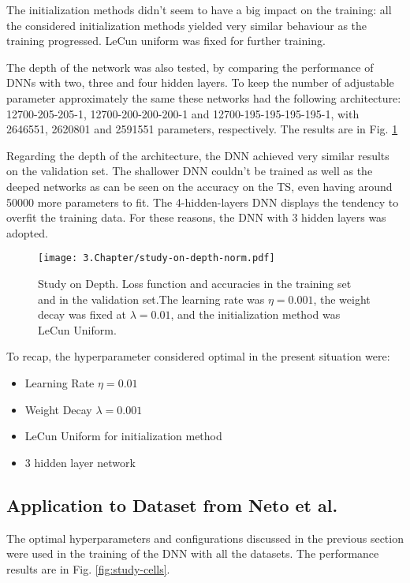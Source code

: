 The initialization methods didn't seem to have a big impact on the training: all the considered initialization methods yielded very similar behaviour as the training progressed. LeCun uniform was fixed for further training.


The depth of the network was also tested, by comparing the performance of DNNs with two, three and four hidden layers. To keep the number of adjustable parameter approximately the same these networks had the following architecture:
12700-205-205-1, 12700-200-200-200-1 and 12700-195-195-195-195-1, with 2646551, 2620801 and 2591551 parameters, respectively. The results are in Fig. \ref{fig:study-depth}

Regarding the depth of the architecture, the DNN achieved very similar results on the validation set. The shallower DNN couldn't be trained as well as the deeped networks as can be seen on the accuracy on the TS, even having around 50000 more parameters to fit. The 4-hidden-layers DNN displays the tendency to overfit the training data. For these reasons, the DNN with 3 hidden layers was adopted.

\begin{figure}[htb]
	\centering
	\texttt{[image: 3.Chapter/study-on-depth-norm.pdf]}
	\caption{Study on Depth. Loss function and accuracies in the training set and in the validation set.The learning rate was $\eta = 0.001$, the weight decay was fixed at $\lambda = 0.01$, and the initialization method was LeCun Uniform.
}
\label{fig:study-depth}
\end{figure}

To recap, the hyperparameter considered optimal in the present situation were:
\begin{itemize}
\item Learning Rate $\eta = 0.01$
\item Weight Decay $\lambda = 0.001$
\item LeCun Uniform for initialization method
\item 3 hidden layer network
\end{itemize}

\subsection{Application to Dataset from Neto et al.}
\label{subsec:application}
The optimal hyperparameters and configurations discussed in the previous section were used in the training of the DNN with all the datasets. The performance results are in Fig. \ref{fig:study-cells}.


